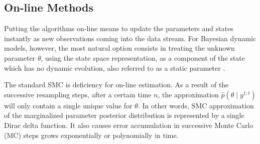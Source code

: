 %
%




\subsection{On-line Methods}

Putting the algorithms on-line means to update the parameters and states instantly as new observations coming into the data stream. For Bayesian dynamic models, however, the most natural option consists in treating the unknown parameter $\theta$, using the state space representation, as a component of the state which has no dynamic evolution, also referred to as a static parameter \cite{cappe2007overview}. 

The standard SMC is deficiency for on-line estimation. As a result of the successive resampling steps, after a certain time $n$, the approximation $\hat{p}(\theta\mid y^{1:t})$ will only contain a single unique value for $\theta$. In other words, SMC approximation of the marginalized parameter posterior distribution is represented by a single Dirac delta
function. It also causes error accumulation in successive Monte Carlo (MC) steps grows exponentially or polynomially in time.

